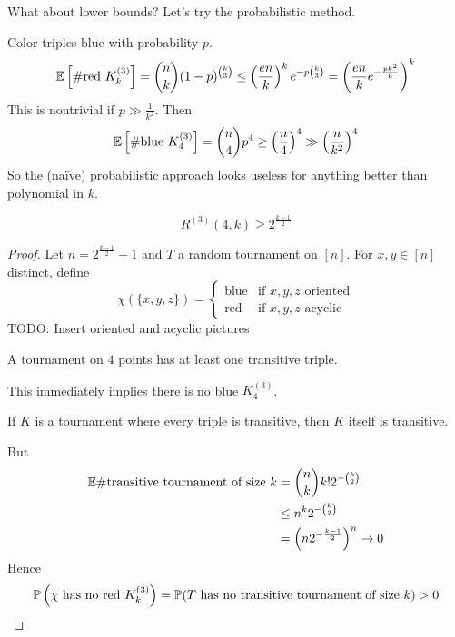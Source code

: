 \documentclass{article}
\begin{document}
What about lower bounds? Let's try the probabilistic method.

Color triples blue with probability $p$.
$$\bbE\left[\#\text{red }K_k^{(3)}\right] = \binom nk (1 - p)^{\binom k3} \le \left(\frac{en}k\right)^k e^{-p\binom k3} = \left(\frac{en}k e^{-\frac{pk^2}6}\right)^k$$
This is nontrivial if $p \gg \frac 1{k^2}$. Then
$$\bbE\left[\#\text{blue }K_4^{(3)}\right] = \binom n4 p^4 \ge \left(\frac n4\right)^4 \gg \left(\frac n{k^2}\right)^4$$
So the (naïve) probabilistic approach looks useless for anything better than polynomial in $k$.

\newlec

\begin{thm}
  $$R^{(3)}(4, k) \ge 2^{\frac{k - 1}2}$$
\end{thm}
\begin{proof}
  Let $n = 2^{\frac{k - 1}2} - 1$ and $T$ a random tournament on $[n]$. For $x, y \in [n]$ distinct, define
  $$\chi(\{x, y, z\}) =
  \begin{cases}
    \text{blue} & \text{if $x, y, z$ oriented} \\
    \text{red} & \text{if $x, y, z$ acyclic}
  \end{cases}$$
  TODO: Insert oriented and acyclic pictures
  \begin{obs}
    A tournament on $4$ points has at least one transitive triple.
  \end{obs}
  This immediately implies there is no blue $K_4^{(3)}$.
  \begin{obs}
    If $K$ is a tournament where every triple is transitive, then $K$ itself is transitive.
  \end{obs}
  But
  \begin{align*}
    \bbE \#\text{transitive tournament of size } k
    & = \binom nk k! 2^{-\binom k2} \\
    & \le n^k 2^{-\binom k2} \\
    & = \left(n2^{-\frac{k - 1}2}\right)^n \to 0
  \end{align*}
  Hence
  $$\P\left(\chi \text{ has no red } K_k^{(3)}\right) = \P(T \text{ has no transitive tournament of size } k) > 0$$
\end{proof}
\end{document}
